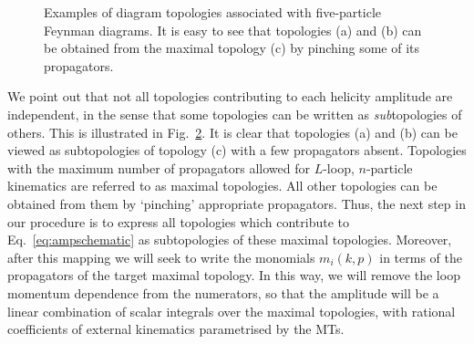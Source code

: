 \documentclass[main.tex]{subfiles}
\begin{document}
\begin{figure}
\begin{subfigure}[b]{0.3\textwidth}
    \caption{} \label{fig:topologyc}
    \end{subfigure}
\caption{Examples of diagram topologies associated with five-particle Feynman diagrams. It is easy to see that topologies (a) and (b) can be obtained from the maximal topology (c) by pinching some of its propagators.}
\label{fig:topologies}
\end{figure}

We point out that not all topologies contributing to each helicity amplitude are independent, in the sense that some topologies can be written as \textit{sub}topologies of others. This is illustrated in Fig.~\ref{fig:topologies}. It is clear that topologies (a) and (b) can be viewed as subtopologies of topology (c) with a few propagators absent. Topologies with the maximum number of propagators allowed for $L$-loop, $n$-particle kinematics are referred to as maximal topologies. All other topologies can be obtained from them by `pinching' appropriate propagators. Thus, the next step in our procedure is to express all topologies which contribute to Eq.~\ref{eq:ampschematic} as subtopologies of these maximal topologies. Moreover, after this mapping we will seek to write the monomials $m_i(k, p)$ in terms of the propagators of the target maximal topology. In this way, we will remove the loop momentum dependence from the numerators, so that the amplitude will be a linear combination of scalar integrals over the maximal topologies, with rational coefficients of external kinematics parametrised by the MTs.
\end{document}
